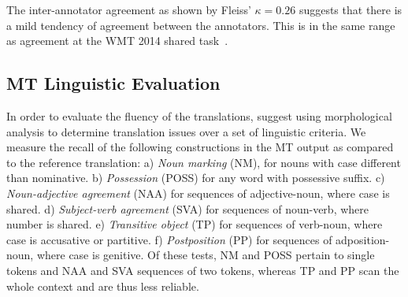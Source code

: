 \documentclass[free]{flammie}
\begin{document}
The inter-annotator agreement as shown by Fleiss' $\kappa = 0.26$ suggests that there is a mild tendency of agreement between the annotators. This is in the same range as agreement at the WMT 2014 shared task~\cite{bojar2014findings}.


\subsection{MT Linguistic Evaluation}\label{subsec:lingmt-eval}

In order to evaluate the fluency of the translations, \cite{clifton2011combining} suggest using morphological analysis to determine translation issues over a set of linguistic criteria. %
We measure the recall of the following constructions in the MT output as compared to the reference translation: %
a) \textit{Noun marking} (NM), for nouns with case different than nominative.
b) \textit{Possession} (POSS) for any word with possessive suffix.
c) \textit{Noun-adjective agreement} (NAA) for sequences of adjective-noun, where case is shared.
d) \textit{Subject-verb agreement} (SVA) for sequences of noun-verb, where number is shared.
e) \textit{Transitive object} (TP) for sequences of verb-noun, where case is accusative or partitive. 
f) \textit{Postposition} (PP) for sequences of adposition-noun, where case is genitive.
Of these tests, NM and POSS pertain to single tokens and NAA and SVA
sequences of two tokens, whereas TP and PP scan the whole context and are thus less reliable.
\end{document}
